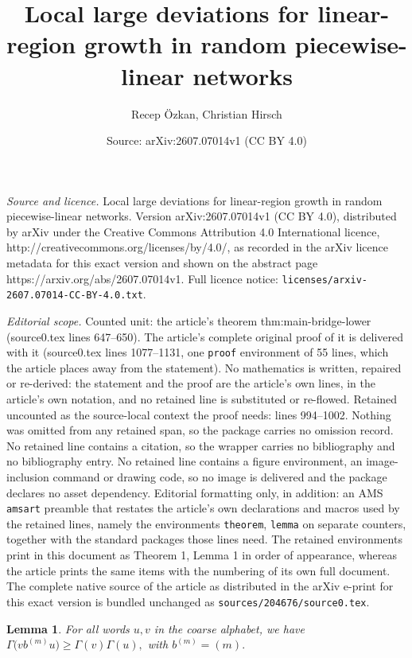 \documentclass[10pt,a4paper]{amsart}
\title{Local large deviations for linear-region growth in random piecewise-linear networks}
\author{Recep \"Ozkan, Christian Hirsch}
\date{Source: arXiv:2607.07014v1 (CC BY 4.0)}
\newtheorem{lemma}{Lemma}
\begin{document}
\maketitle

\noindent\emph{Source and licence.} Local large deviations for linear-region growth in random piecewise-linear networks. Version arXiv:2607.07014v1 (CC BY 4.0), distributed by arXiv under the Creative Commons Attribution 4.0 International licence, http://creativecommons.org/licenses/by/4.0/, as recorded in the arXiv licence metadata for this exact version and shown on the abstract page https://arxiv.org/abs/2607.07014v1. Full licence notice: \texttt{licenses/arxiv-2607.07014-CC-BY-4.0.txt}.\par\smallskip

\noindent\textit{Editorial scope.} Counted unit: the article's theorem thm:main-bridge-lower (source0.tex lines 647--650). The article's complete original proof of it is delivered with it (source0.tex lines 1077--1131, one \texttt{proof} environment of 55 lines, which the article places away from the statement). No mathematics is written, repaired or re-derived: the statement and the proof are the article's own lines, in the article's own notation, and no retained line is substituted or re-flowed.  Retained uncounted as the source-local context the proof needs: lines 994--1002.  Nothing was omitted from any retained span, so the package carries no omission record.  No retained line contains a citation, so the wrapper carries no bibliography and no bibliography entry.  No retained line contains a figure environment, an image-inclusion command or drawing code, so no image is delivered and the package declares no asset dependency.  Editorial formatting only, in addition: an AMS \texttt{amsart} preamble that restates the article's own declarations and macros used by the retained lines, namely the environments \texttt{theorem}, \texttt{lemma} on separate counters, together with the standard packages those lines need.  The retained environments print in this document as Theorem 1, Lemma 1 in order of appearance, whereas the article prints the same items with the numbering of its own full document.  The complete native source of the article as distributed in the arXiv e-print for this exact version is bundled unchanged as \texttt{sources/204676/source0.tex}.
\begin{lemma}\label{thm:bridge-lemma}
For all words \(u,v\) in the coarse alphabet, we have
\(
\Gamma\bigl(v b^{(m)}u\bigr)\ge \Gamma(v)\Gamma(u),
	\)
with	\(
 b^{(m)}=(m).
\)
\end{lemma}
\end{document}
